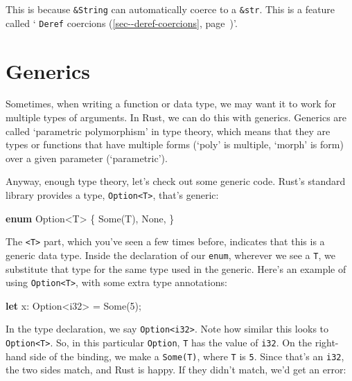 \documentclass[a4paper,]{book}
\renewcommand*{\hypertarget}[3][\ar]{%
  \def\ar{#2}%
  \label{#1}%
  #3}
\renewcommand*{\hyperlink}[2]{%
 #2 (\autoref{#1}, page~\pageref{#1})}
\newenvironment{Shaded}{\begin{snugshade}}{\end{snugshade}}
\newcommand{\KeywordTok}[1]{\textcolor[rgb]{0.13,0.29,0.53}{\textbf{{#1}}}}
\newcommand{\DataTypeTok}[1]{\textcolor[rgb]{0.13,0.29,0.53}{{#1}}}
\newcommand{\DecValTok}[1]{\textcolor[rgb]{0.00,0.00,0.81}{{#1}}}
\newcommand{\ConstantTok}[1]{\textcolor[rgb]{0.00,0.00,0.00}{{#1}}}
\newcommand{\NormalTok}[1]{{#1}}
\begin{document}
This is because \texttt{\&String} can automatically coerce to a
\texttt{\&str}. This is a feature called
`\protect\hyperlink{sec--deref-coercions}{\texttt{Deref} coercions}'.

\hypertarget{sec--generics}{\section{Generics}\label{sec--generics}}

Sometimes, when writing a function or data type, we may want it to work
for multiple types of arguments. In Rust, we can do this with generics.
Generics are called `parametric polymorphism' in type theory, which
means that they are types or functions that have multiple forms (`poly'
is multiple, `morph' is form) over a given parameter (`parametric').

Anyway, enough type theory, let's check out some generic code. Rust's
standard library provides a type,
\texttt{Option\textless{}T\textgreater{}}, that's generic:

\begin{Shaded}
\begin{Highlighting}[]
\KeywordTok{enum} \DataTypeTok{Option}\NormalTok{<T> \{}
    \ConstantTok{Some}\NormalTok{(T),}
    \ConstantTok{None}\NormalTok{,}
\NormalTok{\}}
\end{Highlighting}
\end{Shaded}

The \texttt{\textless{}T\textgreater{}} part, which you've seen a few
times before, indicates that this is a generic data type. Inside the
declaration of our \texttt{enum}, wherever we see a \texttt{T}, we
substitute that type for the same type used in the generic. Here's an
example of using \texttt{Option\textless{}T\textgreater{}}, with some
extra type annotations:

\begin{Shaded}
\begin{Highlighting}[]
\KeywordTok{let} \NormalTok{x: }\DataTypeTok{Option}\NormalTok{<}\DataTypeTok{i32}\NormalTok{> = }\ConstantTok{Some}\NormalTok{(}\DecValTok{5}\NormalTok{);}
\end{Highlighting}
\end{Shaded}

In the type declaration, we say
\texttt{Option\textless{}i32\textgreater{}}. Note how similar this looks
to \texttt{Option\textless{}T\textgreater{}}. So, in this particular
\texttt{Option}, \texttt{T} has the value of \texttt{i32}. On the
right-hand side of the binding, we make a \texttt{Some(T)}, where
\texttt{T} is \texttt{5}. Since that's an \texttt{i32}, the two sides
match, and Rust is happy. If they didn't match, we'd get an error:
\end{document}
